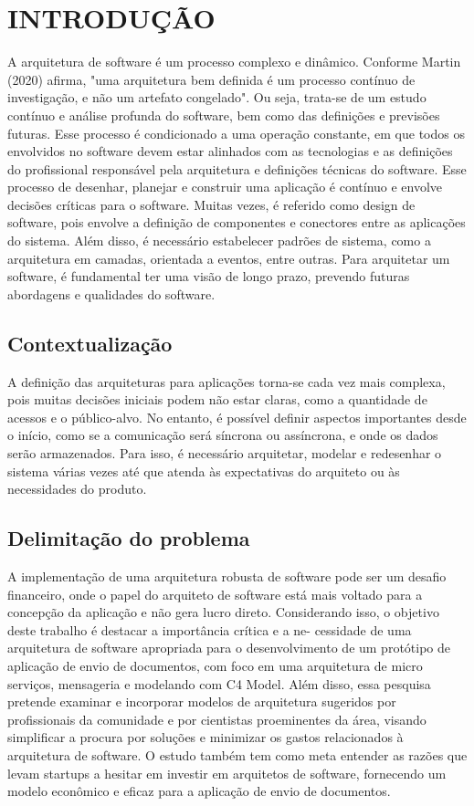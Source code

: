 \chapter{INTRODUÇÃO}
A arquitetura de software é um processo complexo e dinâmico. Conforme Martin (2020)
afirma, "uma arquitetura bem definida é um processo contínuo de investigação, e não um artefato
congelado". Ou seja, trata-se de um estudo contínuo e análise profunda do software, bem como
das definições e previsões futuras. Esse processo é condicionado a uma operação constante, em
que todos os envolvidos no software devem estar alinhados com as tecnologias e as definições
do profissional responsável pela arquitetura e definições técnicas do software. Esse processo
de desenhar, planejar e construir uma aplicação é contínuo e envolve decisões críticas para
o software. Muitas vezes, é referido como design de software, pois envolve a definição de
componentes e conectores entre as aplicações do sistema. Além disso, é necessário estabelecer
padrões de sistema, como a arquitetura em camadas, orientada a eventos, entre outras. Para
arquitetar um software, é fundamental ter uma visão de longo prazo, prevendo futuras abordagens
e qualidades do software.

\section{Contextualização}
A definição das arquiteturas para aplicações torna-se cada vez mais complexa, pois muitas
decisões iniciais podem não estar claras, como a quantidade de acessos e o público-alvo. No
entanto, é possível definir aspectos importantes desde o início, como se a comunicação será
síncrona ou assíncrona, e onde os dados serão armazenados. Para isso, é necessário arquitetar,
modelar e redesenhar o sistema várias vezes até que atenda às expectativas do arquiteto ou às
necessidades do produto.

\section{Delimitação do problema}

A implementação de uma arquitetura robusta de software pode ser um desafio financeiro,
onde o papel do arquiteto de software está mais voltado para a concepção da aplicação e não gera
lucro direto. Considerando isso, o objetivo deste trabalho é destacar a importância crítica e a ne-
cessidade de uma arquitetura de software apropriada para o desenvolvimento de um protótipo de
aplicação de envio de documentos, com foco em uma arquitetura de micro serviços, mensageria
e modelando com C4 Model. Além disso, essa pesquisa pretende examinar e incorporar modelos
de arquitetura sugeridos por profissionais da comunidade e por cientistas proeminentes da área,
visando simplificar a procura por soluções e minimizar os gastos relacionados à arquitetura de
software. O estudo também tem como meta entender as razões que levam startups a hesitar em
investir em arquitetos de software, fornecendo um modelo econômico e eficaz para a aplicação
de envio de documentos.

